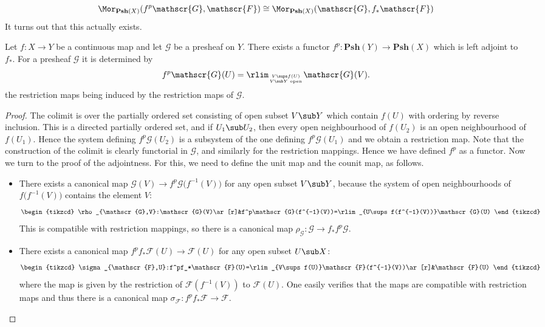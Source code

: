 \[\Mor_{\mathbf{Psh}(X)}(f^{p}\mathscr{G},\mathscr{F})\cong\Mor_{\mathbf{Psh}(X)}(\mathscr{G},f_*\mathscr{F})\]
It turns out that this actually exists.
\begin{proposition}\label{presheaf inverse image exist}
Let $f:X\to Y$ be a continuous map and let $\mathscr{G}$ be a presheaf on $Y$. There exists a functor $f^{p}:\mathbf{Psh}(Y)\to\mathbf{Psh}(X)$ which is left adjoint to $f_*$. For a presheaf $\mathscr{G}$ it is determined by
\[f^p\mathscr{G}(U)=\rlim_{V\sups f(U)\atop\text{$V\sub Y$ open}}\mathscr{G}(V).\]
the restriction maps being induced by the restriction maps of $\mathscr{G}$. 
\end{proposition}
\begin{proof}
The colimit is over the partially ordered set consisting of open subset $V\sub Y$ which contain $f(U)$ with ordering by reverse inclusion. This is a directed partially ordered set, and if $U_1\sub U_2$, then every open neighbourhood of $f(U_2)$ is an open neighbourhood of $f(U_1)$. Hence the system defining $f^{p}\mathscr{G}(U_2)$ is a subsystem of the one defining $f^{p}\mathscr{G}(U_1)$ and we obtain a restriction map. Note that the construction of the colimit is clearly functorial in $\mathscr{G}$, and similarly for the restriction mappings. Hence we have defined $f^{p}$ as a functor. Now we turn to the proof of the adjointness. For this, we need to define the unit map and the counit map, as follows.
\begin{itemize}
\item There exists a canonical map $\mathscr{G}(V)\to f^{p}\mathscr{G}\big(f^{-1}(V)\big)$ for any open subset $V\sub Y$, because the system of open neighbourhoods of $f\big(f^{-1}(V)\big)$ contains the element $V$:
\[\begin{tikzcd}
\rho_{\mathscr{G},V}:\mathscr{G}(V)\ar[r]&f^p\mathscr{G}(f^{-1}(V))=\rlim_{U\sups f(f^{-1}(V))}\mathscr{G}(U)
\end{tikzcd}\] 
This is compatible with restriction mappings, so there is a canonical map $\rho_{\mathscr{G}}:\mathscr{G}\to f_*f^{p}\mathscr{G}$.
\item There exists a canonical map $f^{p}f_*\mathscr{F}(U)\to\mathscr{F}(U)$ for any open subset $U\sub X$:
\[\begin{tikzcd}
\sigma_{\mathscr{F},U}:f^pf_*\mathscr{F}(U)=\rlim_{V\sups f(U)}\mathscr{F}(f^{-1}(V))\ar[r]&\mathscr{F}(U)
\end{tikzcd}\]
where the map is given by the restriction of $\mathscr{F}(f^{-1}(V))$ to $\mathscr{F}(U)$. One easily verifies that the maps are compatible with restriction maps and thus there is a canonical map $\sigma_{\mathscr{F}}:f^{p}f_*\mathscr{F}\to\mathscr{F}$.

\end{itemize}
\end{proof}
